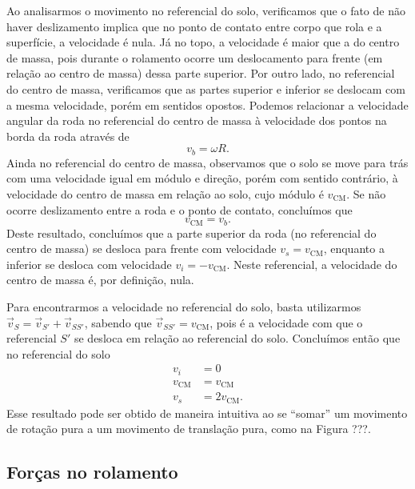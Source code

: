 Ao analisarmos o movimento no referencial do solo, verificamos que o fato de não haver deslizamento implica que no ponto de contato entre corpo que rola e a superfície, a velocidade é nula. Já no topo, a velocidade é maior que a do centro de massa, pois durante o rolamento ocorre um deslocamento para frente (em relação ao centro de massa) dessa parte superior. Por outro lado, no referencial do centro de massa, verificamos que as partes superior e inferior se deslocam com a mesma velocidade, porém em sentidos opostos. Podemos relacionar a velocidade angular da roda no referencial do centro de massa à velocidade dos pontos na borda da roda através de
\begin{equation}
  v_b = \omega R.
\end{equation}
%
Ainda no referencial do centro de massa, observamos que o solo se move para trás com uma velocidade igual em módulo e direção, porém com sentido contrário, à velocidade do centro de massa em relação ao solo, cujo módulo é $v_\textrm{CM}$. Se não ocorre deslizamento entre a roda e o ponto de contato, concluímos que
\begin{equation}
  v_{\textrm{CM}} = v_b.
\end{equation}
%
Deste resultado, concluímos que a parte superior da roda (no referencial do centro de massa) se desloca para frente com velocidade $v_s = v_{\textrm{CM}}$, enquanto a inferior se desloca com velocidade $v_i = -v_{\textrm{CM}}$. Neste referencial, a velocidade do centro de massa é, por definição, nula.

Para encontrarmos a velocidade no referencial do solo, basta utilizarmos $\vec{v}_S = \vec{v}_{S'} + \vec{v}_{SS'}$, sabendo que $\vec{v}_{SS'} = v_{\textrm{CM}}$, pois é a velocidade com que o referencial $S'$ se desloca em relação ao referencial do solo. Concluímos então que no referencial do solo
\begin{align}
  v_i &= 0 \\
  v_{\textrm{CM}} &= v_{\textrm{CM}} \\
  v_s &= 2 v_{\textrm{CM}}.
\end{align}
%
Esse resultado pode ser obtido de maneira intuitiva ao se ``somar'' um movimento de rotação pura a um movimento de translação pura, como na Figura ???. 

\subsection{Forças no rolamento}


